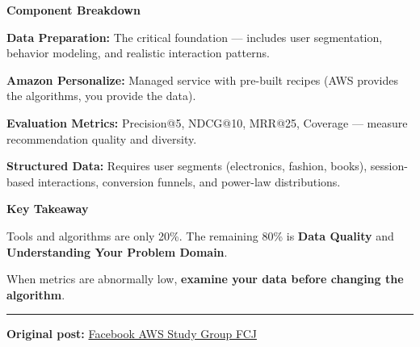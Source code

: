 \vspace{0.5em}\noindent\textbf{Component Breakdown}\par

\textbf{Data Preparation:} The critical foundation --- includes user
segmentation, behavior modeling, and realistic interaction patterns.

\textbf{Amazon Personalize:} Managed service with pre-built recipes (AWS
provides the algorithms, you provide the data).

\textbf{Evaluation Metrics:} Precision@5, NDCG@10, MRR@25, Coverage ---
measure recommendation quality and diversity.

\textbf{Structured Data:} Requires user segments (electronics, fashion,
books), session-based interactions, conversion funnels, and power-law
distributions.

\vspace{0.5em}\noindent\textbf{Key Takeaway}\par

Tools and algorithms are only 20\%. The remaining 80\% is \textbf{Data
Quality} and \textbf{Understanding Your Problem Domain}.

When metrics are abnormally low, \textbf{examine your data before
changing the algorithm}.

\begin{center}\rule{0.5\linewidth}{0.5pt}\end{center}

\textbf{Original post:}
\href{https://www.facebook.com/groups/awsstudygroupfcj/permalink/2229279517837008/?rdid=7zgI0zX0X33fQod5\#}{Facebook
AWS Study Group FCJ}
